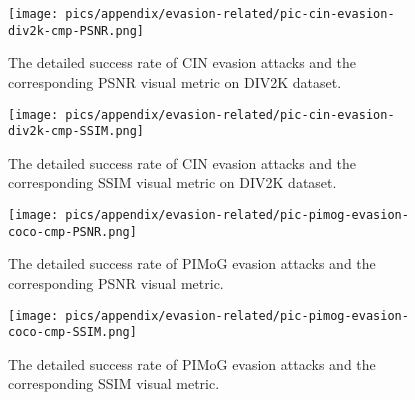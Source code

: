 \begin{figure}[!t]
\begin{minipage}{0.48\linewidth}
    \centering
    \texttt{[image: pics/appendix/evasion-related/pic-cin-evasion-div2k-cmp-PSNR.png]} 
    \vspace{-6mm}
    \caption{The detailed success rate of CIN evasion attacks and the corresponding PSNR visual metric on DIV2K dataset.}
    \label{fig:evasion-related-cin-div2k-psnr}
\end{minipage}\hfill
\begin{minipage}{0.48\linewidth}
    \centering
    \texttt{[image: pics/appendix/evasion-related/pic-cin-evasion-div2k-cmp-SSIM.png]}
    \vspace{-3mm}
    \caption{The detailed success rate of CIN evasion attacks and the corresponding SSIM visual metric on DIV2K dataset.}
    \label{fig:evasion-related-cin-div2k-ssim}
\end{minipage}
\end{figure}



\begin{figure}[!t]
\begin{minipage}{0.48\linewidth}
    \centering
    \texttt{[image: pics/appendix/evasion-related/pic-pimog-evasion-coco-cmp-PSNR.png]} 
    \vspace{-6mm}
    \caption{The detailed success rate of PIMoG evasion attacks and the corresponding PSNR visual metric.}
    \label{fig:evasion-related-pimog-psnr}
\end{minipage}\hfill
\begin{minipage}{0.48\linewidth}
    \centering
    \texttt{[image: pics/appendix/evasion-related/pic-pimog-evasion-coco-cmp-SSIM.png]} 
   
    \vspace{-3mm}
    \caption{The detailed success rate of PIMoG evasion attacks and the corresponding SSIM visual metric.}
    \label{fig:evasion-related-pimog-ssim}
\end{minipage}
\end{figure}



